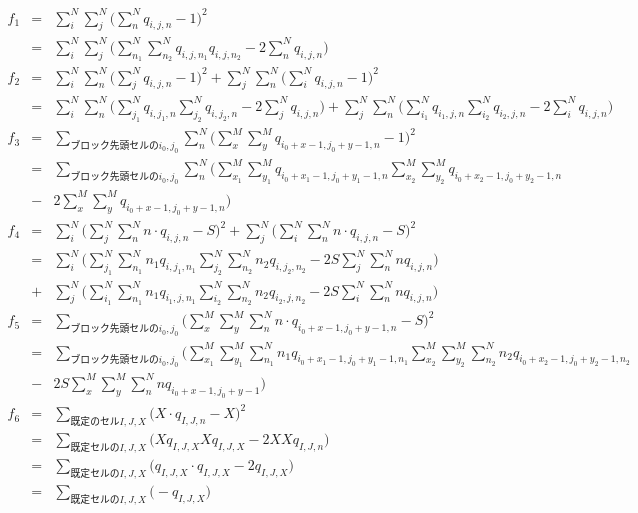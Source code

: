 \documentclass[uplatex,dvipdfmx,a4paper,11pt,oneside,openany]{jsbook}
\begin{document}
\begin{eqnarray*}
  f_1 &=& \sum_i^N\sum_j^N\bigg(\sum_n^N q_{i,j,n} - 1\bigg)^2\\
&=& \sum_i^N\sum_j^N\bigg(\sum_{n_1}^N\sum_{n_2}^N q_{i,j,n_1}q_{i,j,n_2} -2\sum_n^N q_{i,j,n} \bigg)\\
f_2 &=& \sum_i^N\sum_n^N\bigg(\sum_j^N q_{i,j,n} - 1\bigg)^2 + \sum_j^N\sum_n^N\bigg(\sum_i^N q_{i,j,n} - 1\bigg)^2\\
&=& \sum_i^N\sum_n^N\bigg(\sum_{j_1}^Nq_{i,j_1,n}\sum_{j_2}^Nq_{i,j_2,n} - 2\sum_j^N q_{i,j,n}\bigg)
 + \sum_j^N\sum_n^N\bigg(\sum_{i_1}^Nq_{i_1,j,n}\sum_{i_2}^Nq_{i_2,j,n} - 2\sum_i^N q_{i,j,n}\bigg)\\
 f_3 &=& \sum_{ブロック先頭セルのi_0,j_0}\sum_n^N\bigg(\sum_x^M\sum_y^M q_{i_0+x-1,j_0+y-1,n} - 1\bigg)^2\\
 &=& \sum_{ブロック先頭セルのi_0,j_0}\sum_n^N\bigg(\sum_{x_1}^M\sum_{y_1}^M q_{i_0+x_1-1,j_0
 +y_1-1,n}\sum_{x_2}^M\sum_{y_2}^M q_{i_0+x_2-1,j_0
 +y_2-1,n}\\
  &-& 2\sum_x^M\sum_y^M q_{i_0+x-1,j_0+y-1,n}\bigg)\\
 f_4 &=& \sum_i^N\bigg(\sum_j^N\sum_n^N n \cdot q_{i,j,n} - S\bigg)^2 + \sum_j^N\bigg(\sum_i^N\sum_n^N n \cdot q_{i,j,n} - S\bigg)^2\\
 &=& \sum_i^N\bigg(\sum_{j_1}^N\sum_{n_1}^N n_1 q_{i,j_1,n_1}\sum_{j_2}^N\sum_{n_2}^N n_2 q_{i,j_2,n_2} -2S\sum_j^N\sum_n^N n q_{i,j,n}\bigg)\\
 &+& \sum_j^N\bigg(\sum_{i_1}^N\sum_{n_1}^N n_1 q_{i_1,j,n_1}\sum_{i_2}^N\sum_{n_2}^N n_2 q_{i_2,j,n_2} -2S\sum_i^N\sum_n^N n q_{i,j,n}\bigg)\\
 f_5 &=& \sum_{ブロック先頭セルのi_0,j_0}\bigg(\sum_x^M\sum_y^M\sum_n^N n \cdot q_{i_0+x-1,j_0+y-1,n} - S\bigg)^2\\
 &=& \sum_{ブロック先頭セルのi_0,j_0}\bigg(\sum_{x_1}^M\sum_{y_1}^M\sum_{n_1}^N n_1 q_{i_0+x_1-1,j_0+y_1-1,n_1}\sum_{x_2}^M\sum_{y_2}^M\sum_{n_2}^N n_2 q_{i_0+x_2-1,j_0+y_2-1,n_2}\\
  &-& 2S\sum_x^M\sum_y^M\sum_n^N n q_{i_0+x-1,j_0+y-1}\bigg)\\
 f_6 &=& \sum_{既定のセルI,J,X}\bigg(X \cdot q_{I,J,n} - X\bigg)^2\\
 &=& \sum_{既定セルのI,J,X}\bigg( X q_{I,J,X} X q_{I,J,X} - 2 X Xq_{I,J,n}\bigg)\\
 &=& \sum_{既定セルのI,J,X}\bigg(q_{I,J,X}\cdot q_{I,J,X} - 2 q_{I,J,X}\bigg)\\
 &=& \sum_{既定セルのI,J,X}\bigg(-q_{I,J,X}\bigg)
\end{eqnarray*}
\end{document}
